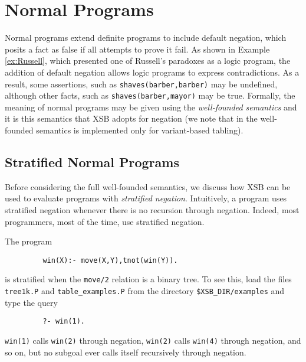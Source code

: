 
\section{Normal Programs}

Normal programs extend definite programs to include default negation,
which posits a fact as false if all attempts to prove it fail.  As
shown in Example \ref{ex:Russell}, which presented one of Russell's
paradoxes as a logic program, the addition of default negation allows
logic programs to express contradictions.  As a result, some
assertions, such as {\tt shaves(barber,barber)} may be undefined,
although other facts, such as {\tt shaves(barber,mayor)} may be true.
Formally, the meaning of normal programs may be given using the {\em
well-founded semantics} and it is this semantics that XSB adopts for
negation (we note that in \version{} the well-founded semantics is
implemented only for variant-based tabling).

\subsection{Stratified Normal Programs}

Before considering the full well-founded semantics, we discuss how XSB
can be used to evaluate programs with {\em stratified negation}.
Intuitively, a program uses stratified negation whenever there is no
recursion through negation.  Indeed, most programmers, most of the
time, use stratified negation.  

\begin{exercise} \label{ex:win1}
The program
\begin{verbatim}
         win(X):- move(X,Y),tnot(win(Y)).
\end{verbatim}
is stratified when the {\tt move/2} relation is a binary tree.  To see
this, load the files \textup{\texttt{tree1k.P}} and
\textup{\texttt{table\_examples.P}} from the directory
\textup{\texttt{\$XSB\_DIR/examples}} and type the query
%
\begin{verbatim}
         ?- win(1).
\end{verbatim}
{\tt win(1)} calls {\tt win(2)} through negation, {\tt win(2)} calls
{\tt win(4)} through negation, and so on, but no subgoal ever calls
itself recursively through negation.
\end{exercise}

